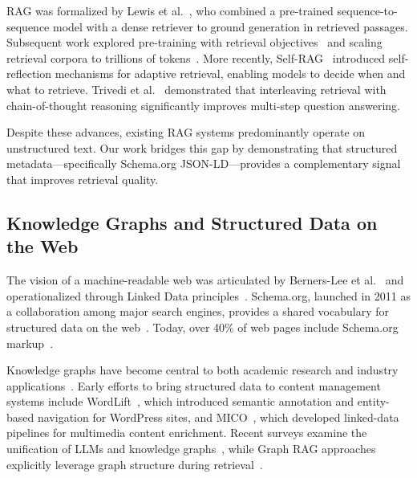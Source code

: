 \documentclass[runningheads]{llncs}
\begin{document}
RAG was formalized by Lewis et al.~\cite{lewis2020rag}, who combined
a pre-trained sequence-to-sequence model with a dense retriever to
ground generation in retrieved passages. Subsequent work explored
pre-training with retrieval objectives~\cite{guu2020realm} and
scaling retrieval corpora to trillions of tokens~\cite{borgeaud2022retro}.
More recently, Self-RAG~\cite{asai2024selfrag} introduced self-reflection
mechanisms for adaptive retrieval, enabling models to decide when and
what to retrieve. Trivedi et al.~\cite{trivedi2023interleaving}
demonstrated that interleaving retrieval with chain-of-thought reasoning
significantly improves multi-step question answering.

Despite these advances, existing RAG systems predominantly operate on
unstructured text. Our work bridges this gap by demonstrating that
structured metadata---specifically Schema.org JSON-LD---provides
a complementary signal that improves retrieval quality.

\subsection{Knowledge Graphs and Structured Data on the Web}

The vision of a machine-readable web was articulated by
Berners-Lee et al.~\cite{berners2001semantic} and operationalized
through Linked Data principles~\cite{bizer2009linked}. Schema.org,
launched in 2011 as a collaboration among major search engines,
provides a shared vocabulary for structured data on the
web~\cite{guha2016schemaorg,schemaorg}. Today, over 40\% of
web pages include Schema.org markup~\cite{guha2016schemaorg}.

Knowledge graphs have become central to both academic research and
industry applications~\cite{hogan2021knowledge,noy2019industry}.
Early efforts to bring structured data to content management systems
include WordLift~\cite{volpini2015wordlift}, which introduced semantic
annotation and entity-based navigation for WordPress sites, and
MICO~\cite{aichroth2015mico}, which developed linked-data pipelines
for multimedia content enrichment.
Recent surveys examine the unification of LLMs and knowledge
graphs~\cite{pan2024graphrag}, while Graph RAG approaches
explicitly leverage graph structure during
retrieval~\cite{peng2024graphretrieval}.
\end{document}
